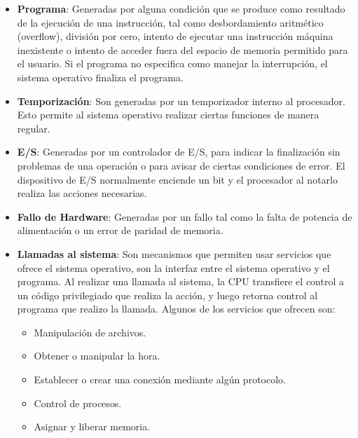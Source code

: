 \documentclass{article}
\begin{document}
	\begin{itemize}
		\item \textbf{Programa}: Generadas por alguna condición que se produce como resultado de la ejecución de una instrucción, tal como desbordamiento aritmético (overflow), división por cero, intento de ejecutar una instrucción máquina inexistente o intento de acceder fuera del espacio de memoria permitido para el usuario.
		Si el programa no especifica como manejar la interrupción, el sistema operativo finaliza el programa.
		
		\item \textbf{Temporización}: Son generadas por un temporizador interno al procesador. Esto permite al sistema operativo realizar ciertas funciones de manera regular.
		
		\item \textbf{E/S}: Generadas por un controlador de E/S, para indicar la finalización sin problemas de una operación o para avisar de ciertas condiciones de error. El dispositivo de E/S normalmente enciende un bit y el procesador al notarlo realiza las acciones necesarias.
		
		\item \textbf{Fallo de Hardware}: Generadas por un fallo tal como la falta de potencia de alimentación o un error de paridad de memoria.
		
		\item \textbf{Llamadas al sistema}: Son mecanismos que permiten usar servicios que ofrece el sistema operativo, son la interfaz entre el sistema operativo y el programa.
		Al realizar una llamada al sistema, la CPU transfiere el control a un código privilegiado que realiza la acción, y luego retorna control al programa que realizo la llamada.
		Algunos de los servicios que ofrecen son:
		\begin{itemize}
			\item Manipulación de archivos.
			\item Obtener o manipular la hora.
			\item Establecer o crear una conexión mediante algún protocolo.
			\item Control de procesos.
			\item Asignar y liberar memoria.
		\end{itemize}
	\end{itemize}
	
	
	
\end{document}
